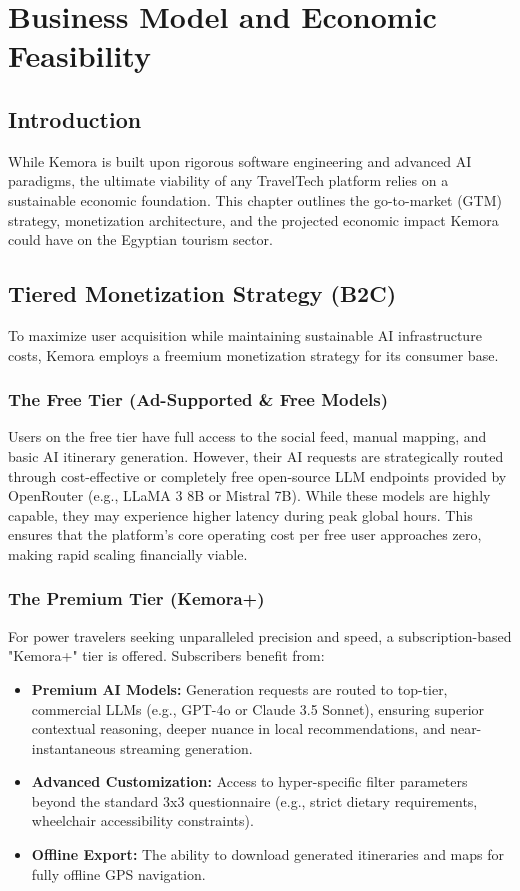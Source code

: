 \chapter{Business Model and Economic Feasibility}

\section{Introduction}
While Kemora is built upon rigorous software engineering and advanced AI paradigms, the ultimate viability of any TravelTech platform relies on a sustainable economic foundation. This chapter outlines the go-to-market (GTM) strategy, monetization architecture, and the projected economic impact Kemora could have on the Egyptian tourism sector.

\section{Tiered Monetization Strategy (B2C)}
To maximize user acquisition while maintaining sustainable AI infrastructure costs, Kemora employs a freemium monetization strategy for its consumer base.

\subsection{The Free Tier (Ad-Supported \& Free Models)}
Users on the free tier have full access to the social feed, manual mapping, and basic AI itinerary generation. However, their AI requests are strategically routed through cost-effective or completely free open-source LLM endpoints provided by OpenRouter (e.g., LLaMA 3 8B or Mistral 7B). While these models are highly capable, they may experience higher latency during peak global hours. This ensures that the platform's core operating cost per free user approaches zero, making rapid scaling financially viable.

\subsection{The Premium Tier (Kemora+)}
For power travelers seeking unparalleled precision and speed, a subscription-based "Kemora+" tier is offered. Subscribers benefit from:
\begin{itemize}
    \item \textbf{Premium AI Models:} Generation requests are routed to top-tier, commercial LLMs (e.g., GPT-4o or Claude 3.5 Sonnet), ensuring superior contextual reasoning, deeper nuance in local recommendations, and near-instantaneous streaming generation.
    \item \textbf{Advanced Customization:} Access to hyper-specific filter parameters beyond the standard 3x3 questionnaire (e.g., strict dietary requirements, wheelchair accessibility constraints).
    \item \textbf{Offline Export:} The ability to download generated itineraries and maps for fully offline GPS navigation.
\end{itemize}

